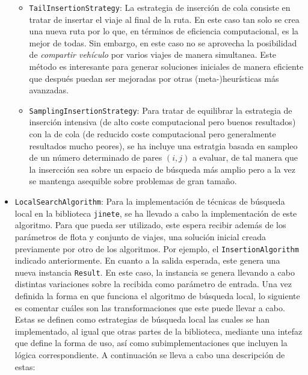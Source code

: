 \documentclass{subfiles}
\begin{document}
\begin{itemize}
\begin{itemize}
                      \item \texttt{TailInsertionStrategy}: La estrategia de inserción de cola consiste en tratar de insertar el viaje al final de la ruta. En este caso tan solo se crea una nueva ruta por lo que, en términos de eficiencia computacional, es la mejor de todas. Sin embargo, en este caso no se aprovecha la posibilidad de \emph{compartir vehículo} por varios viajes de manera simultanea. Este método es interesante para generar soluciones iniciales de manera eficiente que después puedan ser mejoradas por otras (meta-)heurísticas más avanzadas.
                  
                      \item \texttt{SamplingInsertionStrategy}: Para tratar de equilibrar la estrategia de inserción intensiva (de alto coste computacional pero buenos resultados) con la de cola (de reducido coste computacional pero generalmente resultados mucho peores), se ha incluye una estratgia basada en sampleo de un número determinado de pares $(i, j)$ a evaluar, de tal manera que la insercción sea sobre un espacio de búsqueda más amplio pero a la vez se mantenga asequible sobre problemas de gran tamaño.
                  
                  \end{itemize}

              \item \texttt{LocalSearchAlgorithm}: Para la implementación de técnicas de búsqueda local en la biblioteca \texttt{jinete}, se ha llevado a cabo la implementación de este algoritmo. Para que pueda ser utilizado, este espera recibir además de los parámetros de flota y conjunto de viajes, una solución inicial creada previamente por otro de los algoritmos. Por ejemplo, el \texttt{InsertionAlgorithm} indicado anteriormente. En cuanto a la salida esperada, este genera una nueva instancia \texttt{Result}. En este caso, la instancia se genera llevando a cabo distintas variaciones sobre la recibida como parámetro de entrada. Una vez definida la forma en que funciona el algoritmo de búsqueda local, lo siguiente es comentar cuáles son las transformaciones que este puede llevar a cabo. Estas se definen como estrategias de búsqueda local las cuales se han implementado, al igual que otras partes de la biblioteca, mediante una intefaz que define la forma de uso, así como subimplementaciones que incluyen la lógica correspondiente. A continuación se lleva a cabo una descripción de estas:

                  \begin{itemize}


\end{itemize}
\end{itemize}
\end{document}
